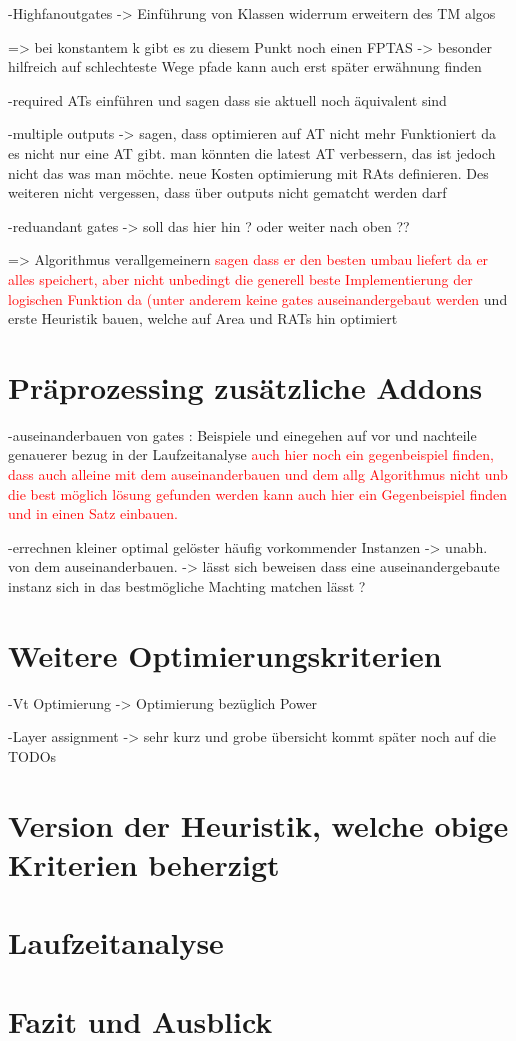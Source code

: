 \documentclass[11pt, a4paper, german]{article}
\begin{document}
	-Highfanoutgates -> Einführung von Klassen widerrum erweitern des TM algos 
	
	=> bei konstantem k gibt es zu diesem Punkt noch einen FPTAS -> besonder hilfreich auf schlechteste Wege pfade kann auch erst später erwähnung finden
	
	-required ATs einführen und sagen dass sie aktuell noch äquivalent sind 
	
	-multiple outputs -> sagen, dass optimieren auf AT nicht mehr Funktioniert da es nicht nur eine AT gibt. man könnten die latest AT verbessern, das ist jedoch nicht das was man möchte. neue Kosten optimierung mit RAts definieren. Des weiteren nicht vergessen, dass über outputs nicht gematcht werden darf 
	
	-reduandant gates -> soll das hier hin ? oder weiter nach oben ??
	
	=> Algorithmus verallgemeinern \textcolor{red}{sagen dass er den besten umbau liefert da er alles speichert, aber nicht unbedingt die generell beste Implementierung der logischen Funktion da (unter anderem keine gates auseinandergebaut werden} und erste Heuristik bauen, welche auf Area  und RATs hin optimiert

\section{Präprozessing  zusätzliche Addons}
-auseinanderbauen von gates : Beispiele und einegehen auf vor und nachteile genauerer bezug in der Laufzeitanalyse \textcolor{red}{auch hier noch ein gegenbeispiel finden, dass auch alleine mit dem auseinanderbauen und dem allg Algorithmus nicht unb die best möglich lösung gefunden werden kann auch hier ein Gegenbeispiel finden und in einen Satz einbauen.}
	
	-errechnen kleiner optimal gelöster häufig vorkommender Instanzen -> unabh. von dem auseinanderbauen.  -> lässt sich beweisen dass eine auseinandergebaute instanz sich in das bestmögliche Machting matchen lässt ? 
	

\section{Weitere Optimierungskriterien}
	-Vt Optimierung -> Optimierung bezüglich Power
	
	-Layer assignment -> sehr kurz und grobe übersicht kommt später noch auf die TODOs 
	
	
\section{Version der Heuristik, welche obige Kriterien beherzigt}

\section{Laufzeitanalyse}

\section{Fazit und Ausblick}
	







\newpage
\end{document}
